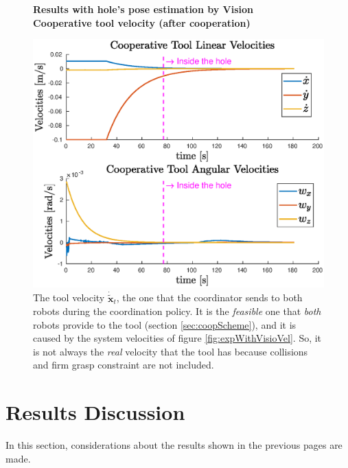 \begin{figure}[H]
	\centering
	\textbf{Results with hole's pose estimation by Vision}\\
	\textbf{Cooperative tool velocity (after cooperation)}
	\vspace{20px}
	\centerline{
		\includegraphics[width=12.5cm]{withVisio/coopToolVel.eps}
	}
	\caption[Plots of cooperative tool velocity]{The tool velocity $\dot{\tilde{\boldsymbol{x}}}_t$, the one that the coordinator sends to both robots during the coordination policy. It is the \emph{feasible} one that \emph{both} robots provide to the tool (section \ref{sec:coopScheme}), and it is caused by the system velocities of figure \ref{fig:expWithVisioVel}. So, it is not always the \emph{real} velocity that the tool has because collisions and firm grasp constraint are not included.}
	\label{fig:expWithVisioVelTool}
\end{figure}



\section{Results Discussion}
\label{sec:resDisc}
In this section, considerations about the results shown in the previous pages are made.\\

